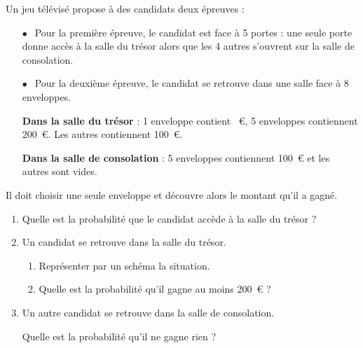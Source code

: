 
\medskip

Un jeu télévisé propose à des candidats deux épreuves :

\setlength\parindent{6mm}
\begin{itemize}
\item[$\bullet~~$]Pour la première épreuve, le candidat est face à 5 portes : une seule
porte donne accès à la salle du trésor alors que les 4 autres s'ouvrent
sur la salle de consolation.
\item[$\bullet~~$]Pour la deuxième épreuve, le candidat se retrouve dans une salle face
à 8 enveloppes.

\textbf{Dans la salle du trésor }: 1 enveloppe contient ~\euro, 5 enveloppes
contiennent 200~\euro. Les autres contiennent 100~\euro.

\textbf{Dans la salle de consolation} : 5 enveloppes contiennent 100~\euro{} et les
autres sont vides.
\end{itemize}
\setlength\parindent{0mm}

Il doit choisir une seule enveloppe et découvre alors le montant qu'il a gagné.

\medskip

\begin{enumerate}
\item Quelle est la probabilité que le candidat accède à la salle du trésor ?
\item Un candidat se retrouve dans la salle du trésor.
	\begin{enumerate}
		\item Représenter par un schéma la situation.
		\item Quelle est la probabilité qu'il gagne au moins 200~\euro{} ?
	\end{enumerate}
\item Un autre candidat se retrouve dans la salle de consolation.

Quelle est la probabilité qu'il ne gagne rien ?
\end{enumerate}

\vspace{0.5cm}

